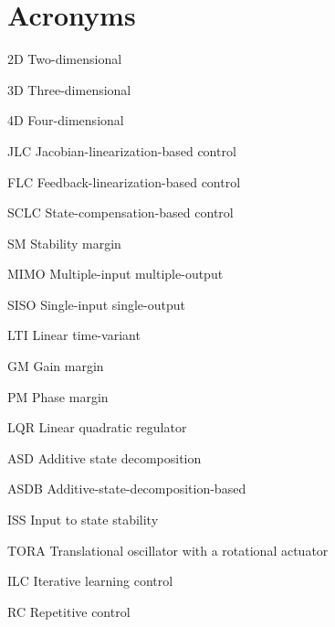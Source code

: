 
\chapter*{Acronyms}

2D  \quad Two-dimensional 

\bigskip

3D  \quad Three-dimensional 

\bigskip

4D  \quad Four-dimensional 

\bigskip

JLC  \quad Jacobian-linearization-based control 

\bigskip

FLC  \quad Feedback-linearization-based control 

\bigskip

SCLC  \quad State-compensation-based control 

\bigskip

SM  \quad Stability margin 

\bigskip

MIMO  \quad Multiple-input multiple-output 

\bigskip

SISO  \quad Single-input single-output 

\bigskip

LTI  \quad Linear time-variant 

\bigskip

GM  \quad Gain margin 

\bigskip

PM  \quad Phase margin 

\bigskip

LQR  \quad Linear quadratic regulator 

\bigskip

ASD  \quad Additive state decomposition 

\bigskip

ASDB  \quad Additive-state-decomposition-based 

\bigskip

ISS  \quad Input to state stability 

\bigskip

TORA  \quad Translational oscillator with a rotational actuator 

\bigskip

ILC  \quad Iterative learning control 

\bigskip

RC  \quad Repetitive control 

